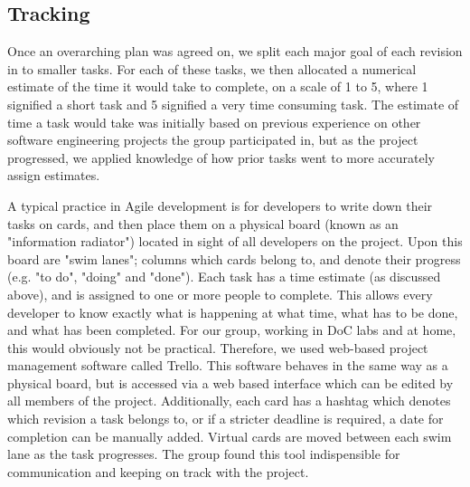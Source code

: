 \documentclass[a4paper, 11pt]{article}
\begin{document}

  \subsection{Tracking}
    Once an overarching plan was agreed on, we split each major goal of each
    revision in to smaller tasks. For each of these tasks, we then allocated a
    numerical estimate of the time it would take to complete, on a scale of 1
    to 5, where 1 signified a short task and 5 signified a very time consuming
    task. The estimate of time a task would take was initially based on
    previous experience on other software engineering projects the group
    participated in, but as the project progressed, we applied knowledge of how
    prior tasks went to more accurately assign estimates.

    A typical practice in Agile development is for developers to write down
    their tasks on cards, and then place them on a physical board (known as an
    "information radiator") located in sight of all developers on the project.
    Upon this board are "swim lanes"; columns which cards belong to, and denote
    their progress (e.g. "to do", "doing" and "done"). Each task has a time
    estimate (as discussed above), and is assigned to one or more people to
    complete.  This allows every developer to know exactly what is happening at
    what time, what has to be done, and what has been completed. For our group,
    working in DoC labs and at home, this would obviously not be practical.
    Therefore, we used web-based project management software called
    Trello. This software behaves in the same way as a physical board, but is
    accessed via a web based interface which can be edited by all members of
    the project.  Additionally, each card has a hashtag which denotes which
    revision a task belongs to, or if a stricter deadline is required, a date
    for completion can be manually added.  Virtual cards are moved between each
    swim lane as the task progresses. The group found this tool indispensible
    for communication and keeping on track with the project.


\end{document}
